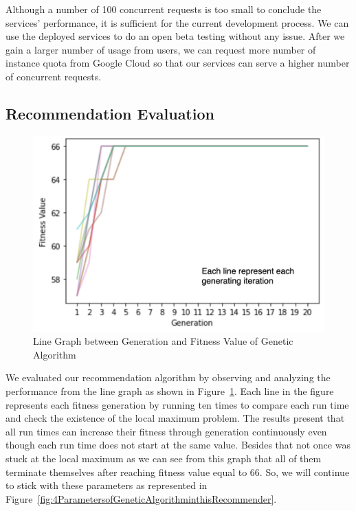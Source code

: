 \documentclass[12pt,oneside,openright,a4paper]{cpe-english-project}
\begin{document}
Although a number of 100 concurrent requests is too small to conclude the services’ performance, it is sufficient for the current development process. We can use the deployed services to do an open beta testing without any issue. After we gain a larger number of usage from users, we can request more number of instance quota from Google Cloud so that our services can serve a higher number of concurrent requests.

\subsection{Recommendation Evaluation}


\begin{figure}[H]\centering
\includegraphics[width=350pt]{./images/4LineGraphbetweenGenerationandFitnessValueofGeneticAlgorithm.png}
\caption{Line Graph between Generation and Fitness Value of Genetic Algorithm}\label{fig:4LineGraphbetweenGenerationandFitnessValueofGeneticAlgorithm}
\end{figure}\vspace{-24pt}

We evaluated our recommendation algorithm by observing and analyzing the performance from the line graph as shown in Figure~\ref{fig:4LineGraphbetweenGenerationandFitnessValueofGeneticAlgorithm}. Each line in the figure represents each fitness generation by running ten times to compare each run time and check the existence of the local maximum problem. The results present that all run times can increase their fitness through generation continuously even though each run time does not start at the same value. Besides that not once was stuck at the local maximum as we can see from this graph that all of them terminate themselves after reaching fitness value equal to 66. So, we will continue to stick with these parameters as represented in Figure~\ref{fig:4ParametersofGeneticAlgorithminthisRecommender}.
\end{document}
